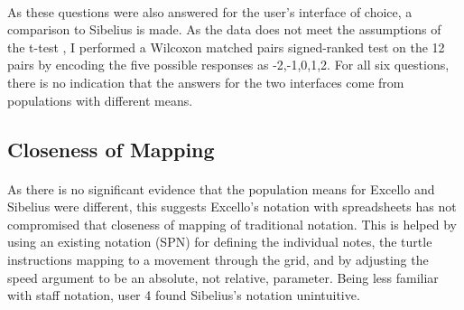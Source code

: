 \label{evaluation:cdnQuestions}

\paragraph{} As these questions were also answered for the user's interface of choice, a comparison to Sibelius is made. As the data does not meet the assumptions of the t-test \cite{barry:likert}, I performed a Wilcoxon matched pairs signed-ranked test on the 12 pairs by encoding the five possible responses as -2,-1,0,1,2. For all six questions, there is no indication that the answers for the two interfaces come from populations with different means.

\subsection{Closeness of Mapping}

\paragraph{} As there is no significant evidence that the population means for Excello and Sibelius were different, this suggests Excello's notation with spreadsheets has not compromised that closeness of mapping of traditional notation. This is helped by using an existing notation (SPN) for defining the individual notes, the turtle instructions mapping to a movement through the grid, and by adjusting the speed argument to be an absolute, not relative, parameter. Being less familiar with staff notation, user 4 found Sibelius's notation unintuitive.

